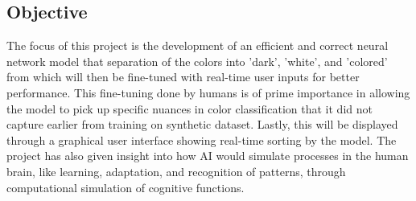 \documentclass{article}
\begin{document}
\subsection{Objective}
The focus of this project is the development of an efficient and correct neural network model that separation of the colors into 'dark', 'white', and 'colored' from which will then be fine-tuned with real-time user inputs for better performance. This fine-tuning done by humans is of prime importance in allowing the model to pick up specific nuances in color classification that it did not capture earlier from training on synthetic dataset. Lastly, this will be displayed through a graphical user interface showing real-time sorting by the model. The project has also given insight into how AI would simulate processes in the human brain, like learning, adaptation, and recognition of patterns, through computational simulation of cognitive functions.
\end{document}
